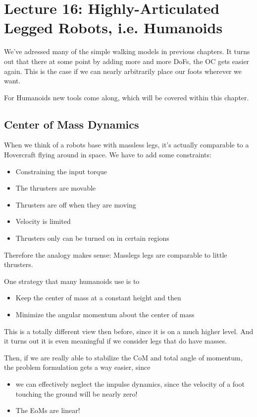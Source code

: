 \chapter{Lecture 16: Highly-Articulated Legged Robots, i.e. Humanoids}
We've adressed many of the simple walking models in previous chapters. It turns out that there at some point by adding more and more DoFs, the OC gets easier again. This is the case if we can nearly arbitrarily place our foots wherever we want.

For Humanoids new tools come along, which will be covered within this chapter. 


\section{Center of Mass Dynamics}
When we think of a robots base with massless legs, it's actually comparable to a Hovercraft flying around in space. We have to add some constraints: 
\begin{itemize}
\item Constraining the input torque
\item The thrusters are movable
\item Thrusters are off when they are moving
\item Velocity is limited
\item Thrusters only can be turned on in certain regions
\end{itemize} 
Therefore the analogy makes sense: Masslegs legs are comparable to little thrusters.

One strategy that many humanoids use is to
\begin{itemize}
\item Keep the center of mass at a constant height and then
\item Minimize the angular momentum about the center of mass
\end{itemize}
This is a totally different view then before, since it is on a much higher level. And it turns out it is even meaningful if we consider legs that do have masses. 

Then, if we are really able to stabilize the CoM and total angle of momentum, the problem formulation gets a way easier, since
\begin{itemize}
\item we can effectively neglect the impulse dynamics, since the velocity of a foot touching the ground will be nearly zero!
\item The EoMs are linear!
\end{itemize}
 

